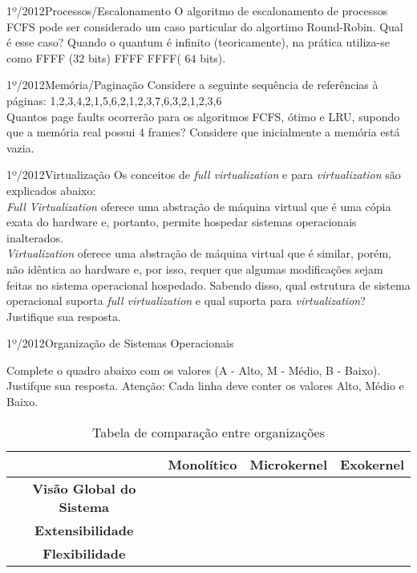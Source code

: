 \begin{exercicio}
  {1º/2012}{Processos/Escalonamento}
  {O algoritmo de escalonamento de processos FCFS pode ser considerado um caso particular do algortimo Round-Robin. Qual é esse caso?}
  Quando o quantum é infinito (teoricamente), na prática utiliza-se como FFFF ($32$ bits) FFFF FFFF( $64$ bits).
\end{exercicio}

\begin{exercicio}
  {1º/2012}{Memória/Paginação}
  {Considere a seguinte sequência de referências à páginas:
  1,2,3,4,2,1,5,6,2,1,2,3,7,6,3,2,1,2,3,6 \\
  Quantos page faults ocorrerão para os algoritmos FCFS, ótimo e LRU, supondo que a memória real possui $4$ frames? Considere que inicialmente a memória está vazia.}

\end{exercicio}

\begin{exercicio}
  {1º/2012}{Virtualização}
  {Os conceitos de \textit{full virtualization} e para \textit{virtualization} são explicados abaixo:\\
  \textit{Full Virtualization} oferece uma abstração de máquina virtual que é uma cópia exata do hardware e, portanto, permite hospedar sistemas operacionais inalterados.\\
  \textit{Virtualization} oferece uma abstração de máquina virtual que é similar, porém, não idêntica ao hardware e, por isso, requer que algumas modificações sejam feitas no sistema operacional hospedado.
  Sabendo disso, qual estrutura de sistema operacional suporta \textit{full virtualization} e qual suporta para \textit{virtualization}? Justifique sua resposta.}
\end{exercicio}

\begin{exercicio}
  {1º/2012}{Organização de Sistemas Operacionais}
  {Complete o quadro abaixo com os valores (A - Alto, M - Médio, B - Baixo). Justifque sua resposta. Atenção: Cada linha deve conter os valores Alto, Médio e Baixo.
  \begin{table}[!h]
    \centering
    \begin{tabular}{clll}
      \hline \hline
      \multicolumn{1}{l}{}             & \multicolumn{1}{c}{\textbf{Monolítico}} & \multicolumn{1}{c}{\textbf{Microkernel}} & \multicolumn{1}{c}{\textbf{Exokernel}} \\ \hline
      \textbf{Visão Global do Sistema} &&& \\
      \textbf{Extensibilidade} &&& \\
      \textbf{Flexibilidade} &&& \\
      \hline \hline
    \end{tabular}
    \caption{Tabela de comparação entre organizações}
    \label{tab:ex15}
    \end{table}}
\end{exercicio}
